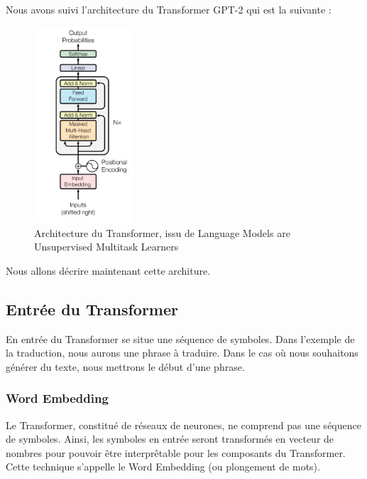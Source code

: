 Nous avons suivi l'architecture du Transformer GPT-2\cite{radford2019gpt2} qui est la suivante :
\begin{figure}[h!]
  \begin{center}
  \includegraphics[width=0.33\textwidth]{img/architecture_transformer_gpt2.png}
  \end{center}
  \caption{Architecture du Transformer, issu de \og Language Models are Unsupervised Multitask Learners \fg{}\cite{radford2019gpt2}}
  \label{fig:transformer_gpt2}
\end{figure}

Nous allons décrire maintenant cette architure.

\subsection{Entrée du Transformer}

En entrée du Transformer se situe une séquence de symboles. Dans l'exemple de la traduction, nous aurons une phrase à traduire.
Dans le cas où nous souhaitons générer du texte, nous mettrons le début d'une phrase.

\subsubsection{Word Embedding}

Le Transformer, constitué de réseaux de neurones, ne comprend pas une séquence de symboles. Ainsi, les symboles en entrée seront transformés en vecteur
de nombres pour pouvoir être interprêtable pour les composants du Transformer. Cette technique s'appelle le Word Embedding (ou plongement de mots). \\

